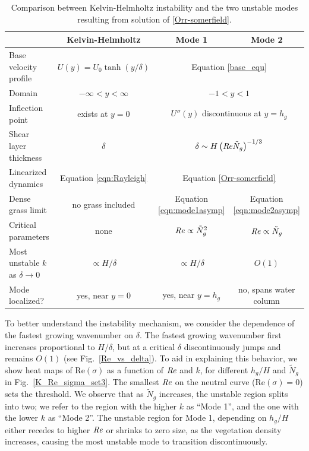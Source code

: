 \documentclass{jfm}
\newcommand{\hg}{h_g}
\newcommand{\Ndg}{\tilde{N}_g}
\begin{document}
\begin{table}
{}  %
\renewcommand{\arraystretch}{1.2}
 \begin{tabular}{l|c|c|c}
			& Kelvin-Helmholtz 				& Mode 1 		& Mode 2 \\ \hline
 Base velocity profile 	& $U(y) = U_0 \tanh(y/\delta)$			& \multicolumn{2}{c}{Equation \eqref{base_equ}} \\
 Domain 		& $-\infty < y < \infty$			& \multicolumn{2}{c}{$-1<y<1$} \\
 Inflection point	& exists at $y=0$				& \multicolumn{2}{c}{$U''(y)$ discontinuous at $y=\hg$} \\
 Shear layer thickness	& $\delta$					& \multicolumn{2}{c}{$\delta \sim  H\left(\Rey \Ndg \right)^{-1/3}$} \\
 Linearized dynamics	& Equation \eqref{eqn:Rayleigh}		& \multicolumn{2}{c}{Equation \eqref{Orr-somerfield}} \\
 Dense grass limit &  no grass included & Equation \eqref{eqn:mode1asymp} & Equation \eqref{eqn:mode2asymp}  \\
 Critical parameters	& none						& $\Rey \propto \Ndg^{2}$ 	& $\Rey \propto \Ndg$ \\
 Most unstable $k$ as $\delta \to 0$	& $\propto H/\delta$		& $\propto H/\delta$	& $O(1)$ \\
 Mode localized?	& yes, near $y=0$				& yes, near $y=\hg$			& no, spans water column
 \end{tabular}
 \caption{Comparison between Kelvin-Helmholtz instability and the two unstable modes resulting from solution of \ref{Orr-somerfield}.}
 \label{tab:comparison}
\end{table}
To better understand the instability mechanism, we consider the dependence of the fastest growing wavenumber on $\delta$.
The fastest growing wavenumber first increases proportional to $H/\delta$, but at a critical $\delta$ discontinuously jumps and remains $O(1)$ (see Fig.~\ref{Re_vs_delta}). 
To aid in explaining this behavior, we show heat maps of Re$(\sigma)$ as a function of $\mbox{\textit{Re}}$ and $k$, for different $\hg/H$ and $\Ndg$ in Fig.~\ref{K_Re_sigma_set3}. 
The smallest $\mbox{\textit{Re}}$ on the neutral curve (Re$(\sigma)=0$) sets the threshold. 
We observe that as $\Ndg$ increases, the unstable region splits into two; we refer to the region with the higher $k$ as ``Mode 1'', and the one with the lower $k$ as ``Mode 2''. 
The unstable region for Mode 1, depending on $\hg/H$ either recedes to higher $\mbox{\textit{Re}}$ or shrinks to zero size, as the vegetation density increases, causing the most unstable mode to transition discontinuously.
\end{document}
